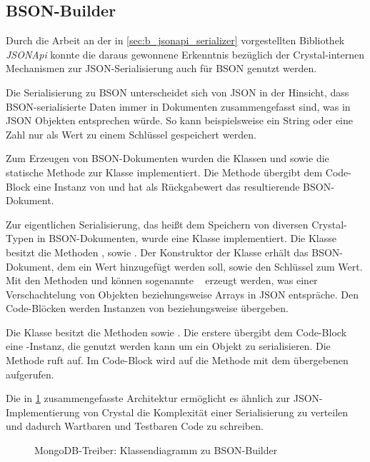 \subsection{BSON-Builder}
\label{ssec:bm_bson_builder}

Durch die Arbeit an der in \cref{sec:b_jsonapi_serializer} vorgestellten
Bibliothek \emph{JSONApi} konnte die daraus gewonnene Erkenntnis bezüglich der
Crystal-internen Mechanismen zur JSON-Serialisierung auch für BSON genutzt
werden.

Die Serialisierung zu BSON unterscheidet sich von JSON in der Hinsicht, dass
BSON-serialisierte Daten immer in Dokumenten zusammengefasst sind, was in JSON
Objekten entsprechen würde.  So kann beispielsweise ein String oder eine Zahl
nur als Wert zu einem Schlüssel gespeichert werden.

Zum Erzeugen von BSON-Dokumenten wurden die Klassen  und
 sowie die statische Methode  zur
Klasse  implementiert.  Die Methode übergibt dem Code-Block eine
Instanz von  und hat als Rückgabewert das resultierende
BSON-Dokument.

Zur eigentlichen Serialisierung, das heißt dem Speichern von diversen
Crystal-Typen in BSON-Dokumenten, wurde eine Klasse 
implementiert.  Die Klasse besitzt die Methoden ,
 sowie .  Der Konstruktor der
Klasse erhält das BSON-Dokument, dem ein Wert hinzugefügt werden soll, sowie
den Schlüssel zum Wert.  Mit den Methoden  und
 können sogenannte ~\cite{mongo-embedded-docs} erzeugt werden, was einer Verschachtelung
von Objekten beziehungsweise Arrays in JSON entspräche.  Den Code-Blöcken werden
Instanzen von  beziehungsweise 
übergeben.

Die Klasse  besitzt die Methoden 
sowie .  Die erstere übergibt dem Code-Block eine
-Instanz, die genutzt werden kann um ein Objekt zu
serialisieren.  Die Methode  ruft
 auf.  Im Code-Block wird auf  die Methode
 mit dem übergebenen  aufgerufen.

Die in \cref{fig:mongocr_builder_klassendiagramm} zusammengefasste Architektur
ermöglicht es ähnlich zur JSON-Implementierung von Crystal die Komplexität
einer Serialisierung zu verteilen und dadurch Wartbaren und Testbaren Code zu
schreiben.

\begin{figure}
	\centering
	
	\caption{MongoDB-Treiber: Klassendiagramm zu BSON-Builder}
	\label{fig:mongocr_builder_klassendiagramm}
\end{figure}
